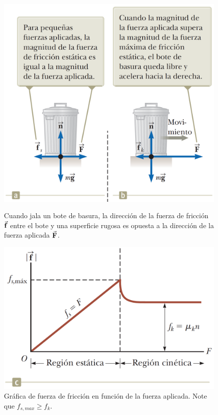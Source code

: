     \begin{figure}[H]
      \centering
      \includegraphics[scale=0.3]{1/graphics_5/figure_4a}
      \caption{Cuando jala un bote de basura, la dirección de la fuerza de fricción $\vec{\mathbf{f}}$ entre el bote y una
      superficie rugosa es opuesta a la dirección de la fuerza aplicada $\vec{\mathbf{F}}$.}
      \endminipage\hspace{8mm}
      \centering
      \vspace{18mm}
      \includegraphics[scale=0.3]{1/graphics_5/figure_4b}
      \caption{Gráfica de fuerza de fricción en función de la fuerza aplicada. Note que $f_{s,max} \geq f_{k}$.}
      \endminipage
    \end{figure}

